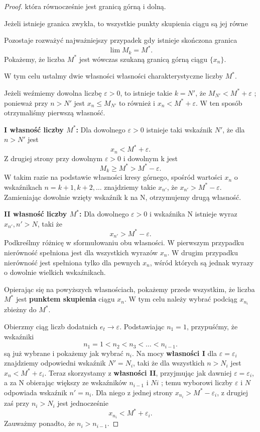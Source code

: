 \begin{proof}
	
	 która równocześnie jest granicą górną i dolną.
	 \begin{remark}
	 	Jeżeli istnieje granica zwykła, to wszystkie punkty skupienia ciągu są jej równe
	 \end{remark} 

	 Pozostaje rozważyć najważniejszy przypadek gdy istnieje skończona granica
	 \[
	 \lim M_{k} = M^{\ast}
	 .\] 
	 Pokażemy, że liczba $M^{\ast}$ jest wówczas szukaną granicą górną ciągu $\{x_{n}\} $.

	 W tym celu ustalmy dwie własności własności charakterystyczne liczby $M^{\ast}$.

	 Jeżeli weźmiemy dowolna liczbę $\varepsilon>0$, to istnieje takie $k=N'$, że $M_{N'} < M^{\ast}+\varepsilon$ ; ponieważ przy $n>N'$ jest $x_{n}\le  M_{N'}$ to również i $x_{n}< M^{\ast}+\varepsilon$. W ten sposób otrzymaliśmy pierwszą własność. 
	 
		 \textbf{I własność liczby $M^{\ast}$:} Dla dowolnego $\varepsilon>0$ istnieje taki wskaźnik $N'$, że dla $n>N'$ jest
			 \[
			 x_{n}< M^{*}+\varepsilon
			 .\] 
	 Z drugiej strony przy dowolnym $\varepsilon>0$ i dowolnym k jest
	 \[
	 M_{k}\ge M^{*}> M^{*}-\varepsilon
	 .\] 
	 W takim razie na podstawie własności kresy górnego, spośród wartości $x_{n}$ o wskaźnikach $n=k+1, k+2,\ldots$ znajdziemy takie $x_{n'}$, że $x_{n'}> M^{*}-\varepsilon$. Zamieniając dowolnie wzięty wskaźnik k na N, otrzymujemy drugą własność.

	 	\textbf{II własność liczby $M^{*}$: } Dla dowolnego  $\varepsilon>0$ i wskaźnika N istnieje wyraz $x_{n'}, n'>N$, taki że
			\[
			x_{n'}> M^{*}-\varepsilon
			.\] 
	 Podkreślmy różnicę w sformułowaniu obu własności. W pierwszym przypadku nierówność spełniona jest dla wszystkich wyrazów  $x_{n}$. W drugim przypadku nierówność jest spełniona tylko dla pewnych $x_{n}$, wśród których są jednak wyrazy o dowolnie wielkich wskaźnikach. 

	 Opierając się na powyższych własnościach, pokażemy przede wszystkim, że liczba $M^{\ast}$ jest \textbf{punktem skupienia} ciągu $x_{n}$. W tym celu należy wybrać podciąg $x_{n_{i}}$ zbieżny do $M^{*}$.

	 Obierzmy ciąg liczb dodatnich $e_{t}\to \varepsilon$. Podstawiając $n_1=1$, przypuśćmy, że wskaźniki 
	 \[
	 n_1 = 1 < n_2 < n_3 < \ldots < n_{i-1}
	 .\]
	 są już wybrane i pokażemy jak wybrać $n_{i}$. Na mocy \textbf{własności I} dla $\varepsilon=\varepsilon_{i}$ znajdziemy odpowiedni wskaźnik $N' = N_{i}$, taki że dla wszystkich $n>N_{i}$ jest $x_{n}< M^{*}+\varepsilon_{i}$. Teraz skorzystamy z \textbf{własności II}, przyjmując jak dawniej $\varepsilon=\varepsilon_{i}$, a za N obierając większy ze wskaźników $n_{i-1}$ i $Ni$ ; temu wyborowi liczby $\varepsilon$ i $N$ odpowiada wskaźnik $n'= n_{i}$. Dla niego z jednej strony
	 $x_{n_{i}} > M^{*} - \varepsilon_{i}$,
	 z drugiej zaś przy $n_{i}> N_{i}$ jest jednocześnie
	 \[
	 x_{n_{i}} < M^{*}+ \varepsilon_{i}
	 .\] 
	 Zauważmy ponadto, że $n_{i}> n_{i-1}$.


\end{proof}
